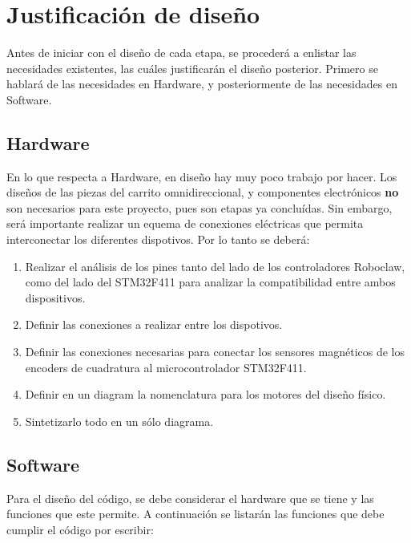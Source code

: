 \section{Justificación de diseño}

Antes de iniciar con el diseño de cada etapa, se procederá a enlistar las necesidades existentes, las cuáles justificarán el diseño posterior. Primero se hablará de las necesidades en Hardware, y posteriormente de las necesidades en Software.

\subsection{Hardware}

En lo que respecta a Hardware, en diseño hay muy poco trabajo por hacer. Los diseños de las piezas del carrito omnidireccional, y componentes electrónicos \textbf{no} son necesarios para este proyecto, pues son etapas ya concluídas. Sin embargo, será importante realizar un equema de conexiones eléctricas que permita interconectar los diferentes dispotivos. Por lo tanto se deberá:

\begin{enumerate}
\item Realizar el análisis de los pines tanto del lado de los controladores Roboclaw, como del lado del STM32F411 para analizar la compatibilidad entre ambos dispositivos.
\item Definir las conexiones a realizar entre los dispotivos.
\item Definir las conexiones necesarias para conectar los sensores magnéticos de los encoders de cuadratura al microcontrolador STM32F411.
\item Definir en un diagram la nomenclatura para los motores del diseño físico.
\item Sintetizarlo todo en un sólo diagrama.
\end{enumerate}

\subsection{Software}

Para el diseño del código, se debe considerar el hardware que se tiene y las funciones que este permite. A continuación se listarán las funciones que debe cumplir el código por escribir:

